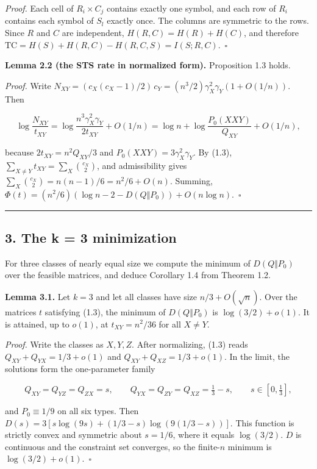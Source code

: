 \documentclass[english,11pt,a4paper]{article}
\begin{document}
\emph{Proof.} Each cell of \(R_i\times C_j\) contains exactly one symbol, and each row of \(R_i\) contains each symbol of \(S_l\) exactly once. The columns are symmetric to the rows. Since \(R\) and \(C\) are independent, \(H(R,C)=H(R)+H(C)\), and therefore \(\mathrm{TC}=H(S)+H(R,C)-H(R,C,S)=I(S;R,C)\).~\(\square\)

\textbf{Lemma 2.2 (the STS rate in normalized form).} Proposition 1.3 holds.

\emph{Proof.} Write \(N_{XY}=(c_X(c_X-1)/2)\,c_Y=(n^3/2)\gamma_X^2\gamma_Y(1+O(1/n))\). Then

\nopagebreak[4]
\[\log\frac{N_{XY}}{t_{XY}}=\log\frac{n^3\gamma_X^2\gamma_Y}{2t_{XY}}+O(1/n)=\log n+\log\frac{P_0(XXY)}{Q_{XY}}+O(1/n),\]

because \(2t_{XY}=n^2Q_{XY}/3\) and \(P_0(XXY)=3\gamma_X^2\gamma_Y\). By (1.3), \(\sum_{X\ne Y}t_{XY}=\sum_X\binom{c_X}{2}\), and admissibility gives \(\sum_X\binom{c_X}{2}=n(n-1)/6=n^2/6+O(n)\). Summing, \(\Phi(t)=(n^2/6)(\log n-2-D(Q\Vert P_0))+O(n\log n)\).~\(\square\)

\begin{center}\rule{0.5\linewidth}{0.5pt}\end{center}

\subsection{3. The k = 3 minimization}\label{the-k-3-minimization}

For three classes of nearly equal size we compute the minimum of \(D(Q\Vert P_0)\) over the feasible matrices, and deduce Corollary 1.4 from Theorem 1.2.

\textbf{Lemma 3.1.} Let \(k=3\) and let all classes have size \(n/3+O(\sqrt n)\). Over the matrices \(t\) satisfying (1.3), the minimum of \(D(Q\Vert P_0)\) is \(\log(3/2)+o(1)\). It is attained, up to \(o(1)\), at \(t_{XY}=n^2/36\) for all \(X\ne Y\).

\emph{Proof.} Write the classes as \(X,Y,Z\). After normalizing, (1.3) reads \(Q_{XY}+Q_{YX}=1/3+o(1)\) and \(Q_{XY}+Q_{XZ}=1/3+o(1)\). In the limit, the solutions form the one-parameter family

\nopagebreak[4]
\[Q_{XY}=Q_{YZ}=Q_{ZX}=s,\qquad Q_{YX}=Q_{ZY}=Q_{XZ}=\tfrac13-s,\qquad s\in[0,\tfrac13],\]

and \(P_0\equiv1/9\) on all six types. Then \(D(s)=3[s\log(9s)+(1/3-s)\log(9(1/3-s))]\). This function is strictly convex and symmetric about \(s=1/6\), where it equals \(\log(3/2)\). \(D\) is continuous and the constraint set converges, so the finite-\(n\) minimum is \(\log(3/2)+o(1)\).~\(\square\)
\end{document}
